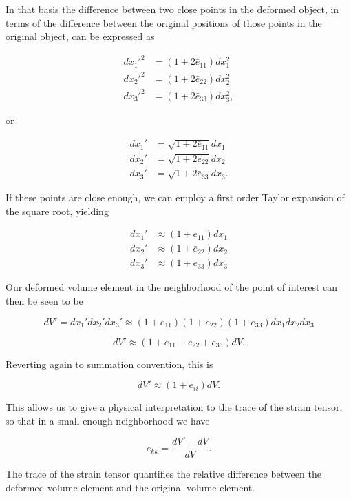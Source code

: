 In that basis the difference between two close points in the deformed object, in terms of the difference between the original positions of those points in the original object, can be expressed as

\begin{align}\label{eqn:continuumL2:270}
{dx_1'}^2 &= (1 + 2 \bar{e}_{11}) dx_1^2 \\
{dx_2'}^2 &= (1 + 2 \bar{e}_{22}) dx_2^2 \\
{dx_3'}^2 &= (1 + 2 \bar{e}_{33}) dx_3^2,
\end{align}

or

\begin{align}\label{eqn:continuumL2:280}
dx_1' &= \sqrt{1 + 2 \bar{e}_{11}} dx_1 \\
dx_2' &= \sqrt{1 + 2 \bar{e}_{22}} dx_2 \\
dx_3' &= \sqrt{1 + 2 \bar{e}_{33}} dx_3.
\end{align}

If these points are close enough, we can employ a first order Taylor expansion of the square root, yielding

\begin{align}\label{eqn:continuumL2:290}
dx_1' &\approx (1 + \bar{e}_{11}) dx_1 \\
dx_2' &\approx (1 + \bar{e}_{22}) dx_2 \\
dx_3' &\approx (1 + \bar{e}_{33}) dx_3
\end{align}

Our deformed volume element in the neighborhood of the point of interest can then be seen to be

\begin{equation}\label{eqn:continuumL2:310}
dV' =
dx_1'
dx_2'
dx_3'
\approx
(1 + e_{11})
(1 + e_{22})
(1 + e_{33})
dx_1 dx_2 dx_3
\end{equation}

\begin{equation}\label{eqn:continuumL2:330}
dV' \approx (1 + e_{11} +e_{22} +e_{33} ) dV.
\end{equation}

Reverting again to summation convention, this is

\begin{equation}\label{eqn:continuumL2:350}
dV' \approx ( 1 + e_{ii} ) dV.
\end{equation}

This allows us to give a physical interpretation to the trace of the strain tensor, so that in a small enough neighborhood we have

\begin{equation}\label{eqn:revTextcontinuumL2:190}
e_{kk} = \frac{dV' - dV}{dV}.
\end{equation}

The trace of the strain tensor quantifies the relative difference between the deformed volume element and the original volume element.
